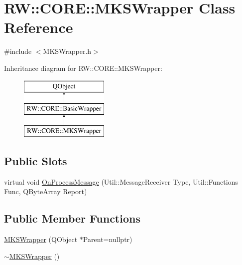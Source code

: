 \hypertarget{class_r_w_1_1_c_o_r_e_1_1_m_k_s_wrapper}{}\section{RW\+:\+:C\+O\+RE\+:\+:M\+K\+S\+Wrapper Class Reference}
\label{class_r_w_1_1_c_o_r_e_1_1_m_k_s_wrapper}


{\ttfamily \#include $<$M\+K\+S\+Wrapper.\+h$>$}

Inheritance diagram for RW\+:\+:C\+O\+RE\+:\+:M\+K\+S\+Wrapper\+:\begin{figure}[H]
\begin{center}
\leavevmode
\includegraphics[height=3.000000cm]{class_r_w_1_1_c_o_r_e_1_1_m_k_s_wrapper}
\end{center}
\end{figure}
\subsection*{Public Slots}
\begin{DoxyCompactItemize}
\item 
virtual void \hyperlink{class_r_w_1_1_c_o_r_e_1_1_m_k_s_wrapper_ad3fa59666812d348b35467c1aa8d02d6}{On\+Process\+Message} (Util\+::\+Message\+Receiver Type, Util\+::\+Functions Func, Q\+Byte\+Array Report)
\end{DoxyCompactItemize}
\subsection*{Public Member Functions}
\begin{DoxyCompactItemize}
\item 
\hyperlink{class_r_w_1_1_c_o_r_e_1_1_m_k_s_wrapper_a003d8db211e3b1f38613b6a886540efb}{M\+K\+S\+Wrapper} (Q\+Object $\ast$Parent=nullptr)
\item 
\hyperlink{class_r_w_1_1_c_o_r_e_1_1_m_k_s_wrapper_a3e40623126c1ac27fa48d0065ed1afab}{$\sim$\+M\+K\+S\+Wrapper} ()
\end{DoxyCompactItemize}
